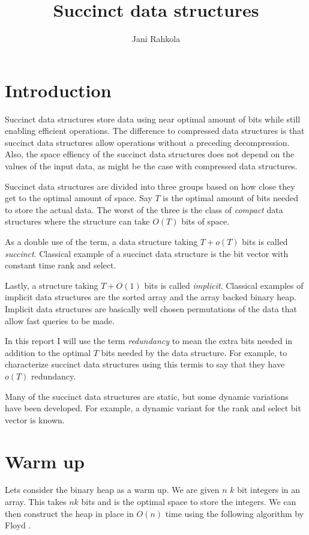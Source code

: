 \documentclass[11pt]{article}
\title{Succinct data structures}
\author{Jani Rahkola}
\newcommand{\bigo}{O}
\newcommand{\smallo}{o}
\begin{document}
\maketitle

\section{Introduction}

Succinct data structures store data using near optimal amount of bits
while still enabling efficient operations. The difference to
compressed data structures is that succinct data structures allow
operations without a preceding decompression. Also, the space effiency
of the succinct data structures does not depend on the values of the
input data, as might be the case with compressed data structures.

Succinct data structures are divided into three groups based on how
close they get to the optimal amount of space. Say $T$ is the optimal
amount of bits needed to store the actual data. The worst of the three
is the class of \emph{compact} data structures where the structure can
take $\bigo(T)$ bits of space.

As a double use of the term, a data structure taking $T + \smallo(T)$
bits is called \emph{succinct}. Classical example of a succinct data
structure is the bit vector with constant time rank and select.

Lastly, a structure taking $T + \bigo(1)$ bits is called
\emph{implicit}. Classical examples of implicit data structures are
the sorted array and the array backed binary heap. Implicit data
structures are basically well chosen permutations of the data that
allow fast queries to be made.

In this report I will use the term \emph{redundancy} to mean the extra
bits needed in addition to the optimal $T$ bits needed by the data
structure. For example, to characterize succinct data structures using
this termis to say that they have $\smallo(T)$ redundancy.

Many of the succinct data structures are static, but some dynamic
variations have been developed. For example, a dynamic variant for the
rank and select bit vector is known.

\section{Warm up}

Lets consider the binary heap as a warm up. We are given $n$ $k$ bit
integers in an array. This takes $nk$ bits and is the optimal space to
store the integers. We can then construct the heap in place in
$\bigo(n)$ time using the following algorithm by Floyd \cite{floyd64}.
\end{document}
